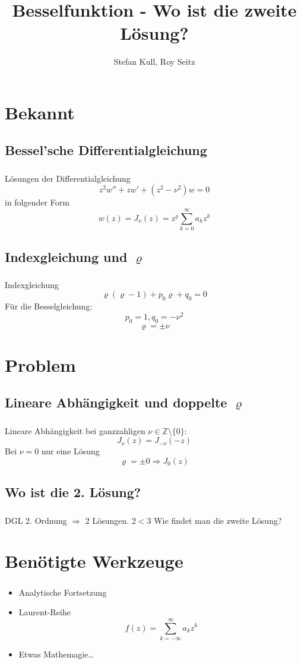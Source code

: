 \documentclass{beamer}
\author{Stefan Kull, Roy Seitz}
\title{Besselfunktion - Wo ist die zweite Lösung?}
\newenvironment{slide}
{\begin{frame}[environment=slide]
	\frametitle{\insertsection}
	\framesubtitle{\insertsubsection}}
{\end{frame}}
\begin{document}
	
	\begin{frame}
		\titlepage
	\end{frame}
	
	\begin{frame}
		\tableofcontents
	\end{frame}
	
\section{Bekannt}	
\subsection{Bessel'sche Differentialgleichung}	
	\begin{slide}
		Lösungen der Differentialgleichung
		$$ z^2w''+zw'+(z^2-\nu^2)w=0 $$
		in folgender Form
		$$
		w(z)=J_\nu(z)=z^\varrho\sum_{k=0}^{\infty}a_kz^k 
		$$
	\end{slide}
	
\subsection{Indexgleichung und $\varrho$}
	\begin{slide}
		Indexgleichung
		$$\varrho(\varrho-1)+p_0\varrho+q_0=0$$
		Für die Besselgleichung:
		$$p_0=1, q_0=-\nu^2$$
		$$\varrho=\pm\nu $$
	\end{slide}

\section{Problem}
\subsection{Lineare Abhängigkeit und doppelte $\varrho$}
	\begin{slide}
		Lineare Abhängigkeit bei ganzzahligen $\nu\in\mathbb{Z}\setminus\{0\}$:
		$$J_\nu(z) = J_{-\nu}(-z)$$
		Bei $\nu=0$ nur eine Lösung
		$$\varrho=\pm 0\Rightarrow J_0(z)$$
	\end{slide}
	
\subsection{Wo ist die 2. Lösung?}
	\begin{slide}		
		DGL 2. Ordnung $\Rightarrow$ 2 Lösungen.
		$2<3$
		Wie findet man die zweite Lösung?
		
	\end{slide}
	
\section{Benötigte Werkzeuge}
	\begin{slide}
		\begin{itemize}
			\item Analytische Fortsetzung
			\item Laurent-Reihe $$f(z)=\sum_{k=-\infty}^{\infty}a_kz^k $$
			\item Etwas Mathemagie\ldots
		\end{itemize}
	\end{slide}
	
\end{document}
